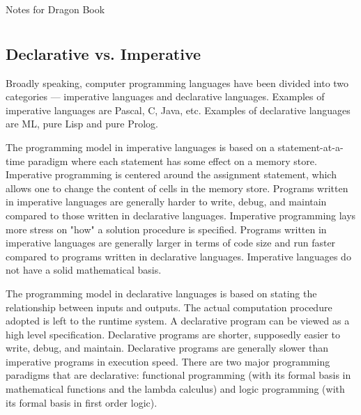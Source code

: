 \documentclass[12pt,a4paper,oneside,draft]{report}
\begin{document}
\titleformat{\chapter}[display] %
{\normalfont\bfseries}{}{0pt}{\Large}

\begin{center}
	Notes for Dragon Book
\end{center}

\chapter{}
\section*{Declarative vs. Imperative}
\indent\indent Broadly speaking, computer programming languages have been divided into two categories — imperative languages and declarative languages.
Examples of imperative languages are Pascal, C, Java, etc. Examples of declarative languages are ML, pure Lisp and pure Prolog.
\par
The programming model in imperative languages is based on a statement-at-a-time paradigm where each statement has some effect on a memory store. Imperative programming is centered around the assignment statement, which allows one to change the content of cells in the memory store. Programs written in imperative languages are generally harder to write, debug, and maintain compared to those written in declarative languages. Imperative programming lays more stress on "how" a solution procedure is specified. Programs written in imperative languages are generally larger in terms of code size and run faster compared to programs written in declarative languages. Imperative languages do not have a solid mathematical basis.
\par
The programming model in declarative languages is based on stating the relationship between inputs and outputs. The actual computation procedure adopted is left to the runtime system. A declarative program can be viewed as a high level specification. Declarative programs are shorter, supposedly easier to write, debug, and maintain. Declarative programs are generally slower than imperative programs in execution speed.
There are two major programming paradigms that are declarative: functional programming (with its formal basis in mathematical functions and the lambda calculus) and logic programming (with its formal basis in first order logic).
\end{document}

